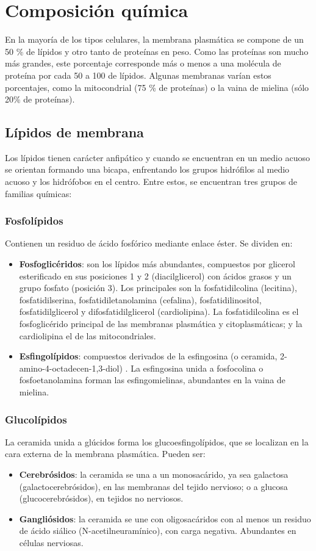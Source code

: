 \section{Composición química}
En la mayoría de los tipos celulares, la membrana plasmática se compone de un 50 \% de lípidos y otro tanto de proteínas en peso. Como las proteínas son mucho más grandes, este porcentaje corresponde más o menos a una molécula de proteína por cada 50 a 100 de lípidos. Algunas membranas varían estos porcentajes, como la mitocondrial (75 \% de proteínas) o la vaina de mielina (sólo 20\% de proteínas).
\subsection{Lípidos de membrana}
Los lípidos tienen carácter anfipático y cuando se encuentran en un medio acuoso se orientan formando una bicapa, enfrentando los grupos hidrófilos al medio acuoso y los hidrófobos en el centro. Entre estos, se encuentran tres grupos de familias químicas:
\subsubsection{Fosfolípidos}
Contienen un residuo de ácido fosfórico mediante enlace éster. Se dividen en:
\begin{itemize}[itemsep=0pt,parsep=0pt,topsep=0pt,partopsep=0pt]
    \item \textbf{Fosfoglicéridos}: son los lípidos más abundantes, compuestos por glicerol esterificado en sus posiciones 1 y 2 (diacilglicerol) con ácidos grasos y un grupo fosfato (posición 3). Los principales son la fosfatidilcolina (lecitina), fosfatidilserina, fosfatidiletanolamina (cefalina), fosfatidilinositol, fosfatidilglicerol y difosfatidilglicerol (cardiolipina). La fosfatidilcolina es el fosfoglicérido principal de las membranas plasmática y citoplasmáticas; y la cardiolipina el de las mitocondriales.
    \item\textbf{Esfingolípidos}: compuestos derivados de la esfingosina (o ceramida, 2-amino-4-octadecen-1,3-diol) . La esfingosina unida a fosfocolina o fosfoetanolamina forman las esfingomielinas, abundantes en la vaina de mielina.
\end{itemize}
\subsubsection{Glucolípidos}
La ceramida unida a glúcidos forma los glucoesfingolípidos, que se localizan en la cara externa de la membrana plasmática. Pueden ser:
\begin{itemize}[itemsep=0pt,parsep=0pt,topsep=0pt,partopsep=0pt]
    \item \textbf{Cerebrósidos}: la ceramida se una a un monosacárido, ya sea galactosa (galactocerebrósidos), en las membranas del tejido nervioso; o a glucosa (glucocerebrósidos), en tejidos no nerviosos.
    \item\textbf{Gangliósidos}: la ceramida se une con oligosacáridos con al menos un residuo de ácido siálico (N-acetilneuramínico), con carga negativa. Abundantes en células nerviosas.
\end{itemize}
